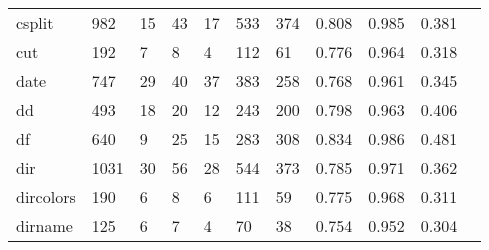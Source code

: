 \begin{longtable}{lp{1.10cm}p{1.10cm}p{1.10cm}p{1.10cm}p{1.10cm}p{1.10cm}p{1.10cm}p{1.10cm}p{1.10cm}p{1.10cm}}
csplit    &                    982 &                                 15 &                                43 &                               17 &                               533 &                             374 &                             0.808 &                                 0.985 &                               0.381 \\
cut       &                    192 &                                  7 &                                 8 &                                4 &                               112 &                              61 &                             0.776 &                                 0.964 &                               0.318 \\
date      &                    747 &                                 29 &                                40 &                               37 &                               383 &                             258 &                             0.768 &                                 0.961 &                               0.345 \\
dd        &                    493 &                                 18 &                                20 &                               12 &                               243 &                             200 &                             0.798 &                                 0.963 &                               0.406 \\
df        &                    640 &                                  9 &                                25 &                               15 &                               283 &                             308 &                             0.834 &                                 0.986 &                               0.481 \\
dir       &                   1031 &                                 30 &                                56 &                               28 &                               544 &                             373 &                             0.785 &                                 0.971 &                               0.362 \\
dircolors &                    190 &                                  6 &                                 8 &                                6 &                               111 &                              59 &                             0.775 &                                 0.968 &                               0.311 \\
dirname   &                    125 &                                  6 &                                 7 &                                4 &                                70 &                              38 &                             0.754 &                                 0.952 &                               0.304 \\

\end{longtable}

